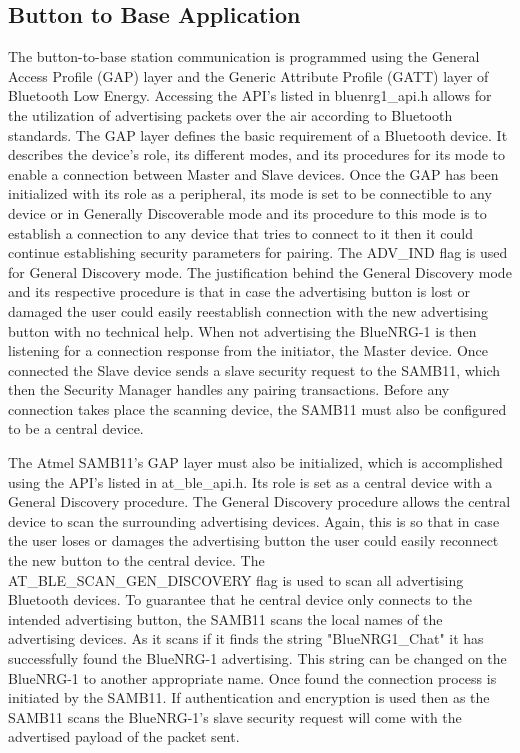 \documentclass[journal,compsoc]{IEEEtran}
\begin{document}
\subsection{Button to Base Application}
The button-to-base station communication is programmed using the General Access Profile (GAP) layer and the Generic Attribute Profile (GATT) layer of Bluetooth Low Energy.  Accessing the API’s listed in bluenrg1\_api.h allows for the utilization of advertising packets over the air according to Bluetooth standards.  The GAP layer defines the basic requirement of a Bluetooth device.  It describes the device's role, its different modes, and its procedures for its mode to enable a connection between Master and Slave devices.  Once the GAP has been initialized with its role as a peripheral, its mode is set to be connectible to any device or in Generally Discoverable mode and its procedure to this mode is to establish a connection to any device that tries to connect to it then it could continue establishing security parameters for pairing. The ADV\_IND flag is used for General Discovery mode. The justification behind the General Discovery mode and its respective procedure is that in case the advertising button is lost or damaged the user could easily reestablish connection with the new advertising button with no technical help. When not advertising the BlueNRG-1 is then listening for a connection response from the initiator, the Master device. Once connected the Slave device sends a slave security request to the SAMB11, which then the Security Manager handles any pairing transactions. Before any connection takes place the scanning device, the SAMB11 must also be configured to be a central device.

The Atmel SAMB11’s GAP layer must also be initialized, which is accomplished using the API's listed in at\_ble\_api.h.  Its role is set as a central device with a General Discovery procedure. The General Discovery procedure allows the central device to scan the surrounding advertising devices. Again, this is so that in case the user loses or damages the advertising button the user could easily reconnect the new button to the central device. The AT\_BLE\_SCAN\_GEN\_DISCOVERY flag is used to scan all advertising Bluetooth devices. To guarantee that he central device only connects to the intended advertising button, the SAMB11 scans the local names of the advertising devices. As it scans if it finds the string "BlueNRG1\_Chat" it has successfully found the BlueNRG-1 advertising. This string can be changed on the BlueNRG-1 to another appropriate name. Once found the connection process is initiated by the SAMB11. If authentication and encryption is used then as the SAMB11 scans the BlueNRG-1's slave security request will come with the advertised payload of the packet sent.
\end{document}
